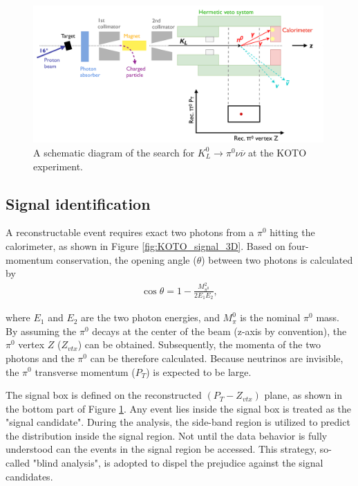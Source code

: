 
\begin{figure}[h]
\begin{center}
\captionsetup{width=.99\linewidth}
\includegraphics[width=0.99\textwidth]{Figures/Chapter3/schematic_ptz.pdf}
\caption{A schematic diagram of the search for $K_L^0 \to \pi^0 \nu \overline{\nu}$ at the KOTO experiment. }
\label{fig:schematic_KOTO}
\end{center}
\end{figure}


\subsection{Signal identification}

A reconstructable event requires exact two photons from a $\pi^0$ hitting the calorimeter, as shown in Figure \ref{fig:KOTO_signal_3D}. Based on four-momentum conservation, the opening angle ($\theta$) between two photons is calculated by %
%
\vspace{1em}
\begin{align}
\cos{\theta} = 1 - \frac{M_{\pi^0}^2}{2 E_1 E_2 },
\end{align}

\noindent 
where $E_1$ and $E_2$ are the two photon energies, and $M_\pi^0$ is the nominal $\pi^0$ mass. By assuming the $\pi^0$ decays at the center of the beam  (z-axis by convention), the $\pi^0$ vertex $Z$ ($Z_{vtx}$) can be obtained. Subsequently, the momenta of the two photons and the $\pi^0$ can be therefore calculated. Because neutrinos are invisible, the $\pi^0$ transverse momentum ($P_T$) is expected to be large.  

The signal box is defined on the reconstructed $(P_T - Z_{vtx})$ plane, as shown in the bottom part of Figure \ref{fig:schematic_KOTO}. Any event lies inside the signal box is treated as the "signal candidate". During the analysis, the side-band region is utilized to predict the distribution inside the signal region. Not until the data behavior is fully understood can the events in the signal region be accessed. This strategy, so-called "blind analysis", is adopted to dispel the prejudice against the signal candidates.

